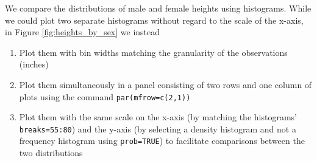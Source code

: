 \documentclass{article}\usepackage[]{graphicx}\usepackage[]{color}
\begin{document}
We compare the distributions of male and female heights using histograms.  While we could plot two separate histograms without regard to the scale of the x-axis, in Figure \ref{fig:heights_by_sex} we instead

\begin{enumerate}
\item Plot them with bin widths matching the granularity of the observations (inches)
\item Plot them simultaneously in a panel consisting of two rows and one column of plots using the command \verb#par(mfrow=c(2,1))#
\item Plot them with the same scale on the x-axis (by matching the histograms' \verb#breaks=55:80#) and the y-axis (by selecting a density histogram and not a frequency histogram using \verb#prob=TRUE#) to facilitate comparisons between the two distributions
\end{enumerate}
\end{document}
